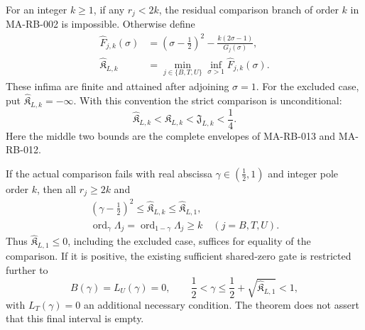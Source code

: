 For an integer \(k\ge1\), if any \(r_j<2k\), the residual
comparison branch of order \(k\) in MA-RB-002 is impossible.
Otherwise define
\[
 \begin{aligned}
  \widehat F_{j,k}(\sigma)
       &=(\sigma-\tfrac12)^2
                         -\frac{k(2\sigma-1)}{G_j(\sigma)},\\
  \widehat{\mathfrak K}_{L,k}
       &=\min_{j\in\{B,T,U\}}\inf_{\sigma>1}
                                      \widehat F_{j,k}(\sigma).
 \end{aligned}
 \tag{MA-RB.254}
\]
These infima are finite and attained after adjoining
\(\sigma=1\). For the excluded case, put
\(\widehat{\mathfrak K}_{L,k}=-\infty\).
With this convention the strict comparison is unconditional:
\[
 \widehat{\mathfrak K}_{L,k}
          <\mathfrak K_{L,k}<\mathfrak J_{L,k}<\frac14.
 \tag{MA-RB.255}
\]
Here the middle two bounds are the complete envelopes of
MA-RB-013 and MA-RB-012.

If the actual comparison fails with real abscissa
\(\gamma\in(\tfrac12,1)\) and integer pole order \(k\), then
all \(r_j\ge2k\) and
\[
 \begin{gathered}
   (\gamma-\tfrac12)^2\le\widehat{\mathfrak K}_{L,k}
                         \le\widehat{\mathfrak K}_{L,1},\\
   \operatorname{ord}_{\gamma}\Lambda_j
     =\operatorname{ord}_{1-\gamma}\Lambda_j\ge k
                                  \quad(j=B,T,U).
 \end{gathered}
 \tag{MA-RB.256}
\]
Thus \(\widehat{\mathfrak K}_{L,1}\le0\), including the
excluded case, suffices for equality of the comparison.
If it is positive, the existing sufficient shared-zero gate
is restricted further to
\[
 B(\gamma)=L_U(\gamma)=0,\qquad
 \frac12<\gamma\le\frac12+
                    \sqrt{\widehat{\mathfrak K}_{L,1}}<1,
 \tag{MA-RB.257}
\]
with \(L_T(\gamma)=0\) an additional necessary condition.
The theorem does not assert that this final interval is empty.

